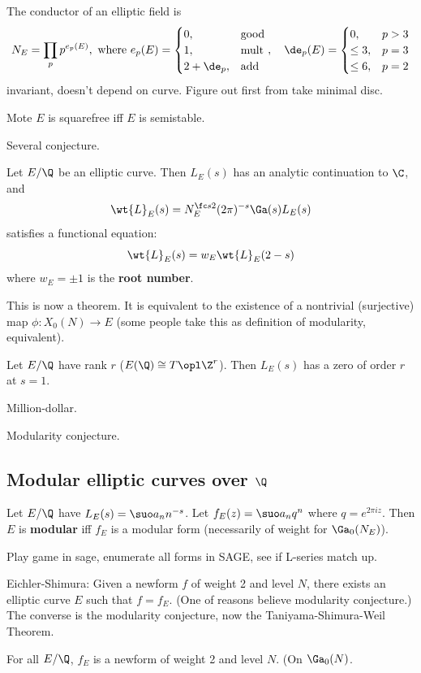 \begin{df}
The conductor of an elliptic field is
\[
N_E=\prod_p p^{e_p(E)},\text{ where }e_p(E)=
\begin{cases}
0,&\text{good}\\
1,&\text{mult}\\
2+\de_p,&\text{add}
\end{cases}
,\quad
\de_p(E)=\begin{cases}
0,&p>3\\
\le 3,&p=3\\
\le 6,&p=2
\end{cases}
\]%
invariant, doesn't depend on curve. Figure out first from take minimal disc.
\end{df}

Mote $E$ is squarefree iff $E$ is semistable.

Several conjecture.
\begin{conj}
Let $E/\Q$ be an elliptic curve. Then $L_E(s)$ has an analytic continuation to $\C$, and
\[
\wt{L}_E(s)=N_E^{\fc s2}(2\pi)^{-s}\Ga(s)L_E(s)
\]
satisfies a functional equation:
\[
\wt{L}_E(s)=w_E\wt{L}_E(2-s)
\]
where $w_E=\pm 1$ is the \textbf{root number}.
\end{conj}
This is now a theorem. It is equivalent to the existence of a nontrivial (surjective) map $\phi:X_0(N)\to E$ (some people take this as definition of modularity, equivalent).
\begin{conj}[BSD]
Let $E/\Q$ have rank $r$ ($E(\Q)\cong T\opl \Z^r$). Then $L_E(s)$ has a zero of order $r$ at $s=1$.
\end{conj}
Million-dollar.

Modularity conjecture.
\subsection{Modular elliptic curves over $\Q$}
\begin{df}
Let $E/\Q$ have $L_E(s)=\suo a_nn^{-s}$. Let $f_E(z)=\suo a_nq^n$ where $q=e^{2\pi i z}$. Then $E$ is \textbf{modular} iff $f_E$ is a modular form (necessarily of weight for $\Ga_0(N_E)$). 
\end{df}
Play game in sage, enumerate all forms in SAGE, see if L-series match up.

Eichler-Shimura: Given a newform $f$ of weight 2 and level $N$, there exists an elliptic curve $E$ such that $f=f_E$. (One of reasons believe modularity conjecture.) The converse is the modularity conjecture, now the Taniyama-Shimura-Weil Theorem.
\begin{thm}
For all $E/\Q$, $f_E$ is a newform of weight 2 and level $N$. (On $\Ga_0(N)$.
\end{thm}

